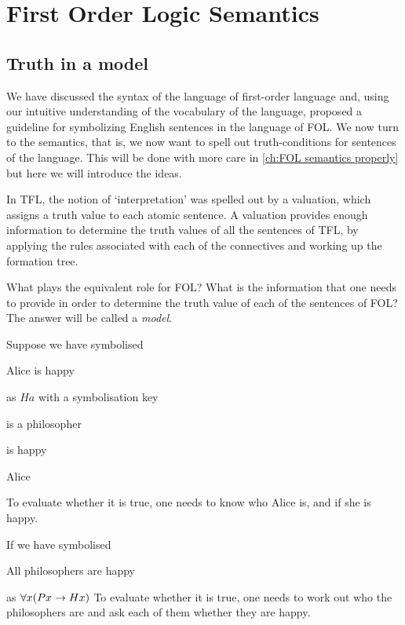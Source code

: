 \part{First Order Logic Semantics}
\label{ch:semantics}

\chapter{Truth in a model}
\label{ch:FOL semantics informal}
We have discussed the syntax of the language of first-order language and, using our intuitive understanding of the vocabulary of the language, proposed a guideline for symbolizing English sentences in the language of FOL. We now turn to the semantics, that is, we now want to spell out truth-conditions for sentences of the language. This will be done with more care in \cref{ch:FOL semantics properly} but here we will introduce the ideas.

In TFL, the notion of `interpretation' was spelled out by a valuation, which assigns a truth value to each atomic sentence. A valuation provides enough information to determine the truth values of all the sentences of TFL, by applying the rules associated with each of the connectives and working up the formation tree.

What plays the equivalent role for FOL? What is the information that one needs to provide in order to determine the truth value of each of the sentences of FOL? The answer will be called a \emph{model}. 

Suppose we have symbolised 
\begin{samplesent}
	\item Alice is happy
\end{samplesent}
as $Ha$
with a symbolisation key
\begin{ekey}
	\item[Px]  is a philosopher
	\item[Hx]  is happy
	\item[a] Alice
\end{ekey}

To evaluate whether it is true, one needs to know who Alice is, and if she is happy. 

If we have symbolised 
\begin{samplesent}
	\item All philosophers are happy
\end{samplesent}
as $\forall x(Px\rightarrow Hx)$
To evaluate whether it is true, one needs to work out who the philosophers are and ask each of them whether they are happy. 

